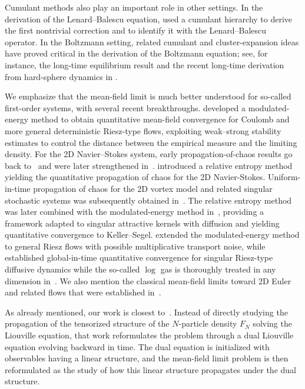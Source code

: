 \documentclass[pdflatex,sn-mathphys-num]{sn-jnl}
\theoremstyle{thmstyleone}%
\theoremstyle{thmstyletwo}%
\theoremstyle{thmstylethree}%
\begin{document}
Cumulant methods also play an important role in other settings. In the derivation of the Lenard--Balescu equation, \cite{duerinckx2021lenard} used a cumulant hierarchy to derive the first nontrivial correction and to identify it with the Lenard--Balescu operator. In the Boltzmann setting, related cumulant and cluster-expansion ideas have proved critical in the derivation of the Boltzmann equation; see, for instance, the long-time equilibrium result \cite{bodineau2024long} and the recent long-time derivation from hard-sphere dynamics in \cite{deng2024long}.

 We emphasize that the mean-field limit is much better understood for so-called first-order systems, with several recent breakthroughs.  \cite{serfaty2020mean} developed a modulated-energy method to obtain quantitative mean-field convergence for Coulomb and more general deterministic Riesz-type flows, exploiting weak--strong stability estimates to control the distance between the empirical measure and the limiting density. For the 2D Navier--Stokes system, early propagation-of-chaos results go back to~\cite{osada1986propagation} and were later strengthened in~\cite{fournier2014propagation}. \cite{jabin2018quantitative} introduced a relative entropy method yielding the quantitative propagation of chaos for the 2D Navier-Stokes. Uniform-in-time propagation of chaos for the 2D vortex model and related singular stochastic systems was subsequently obtained in~\cite{guillin2024uniform}. The relative entropy method was later combined with the modulated-energy method in~\cite{bresch2023mean}, providing a framework adapted to singular attractive kernels with diffusion and yielding quantitative convergence to Keller--Segel. \cite{nguyen2022mean} extended the modulated-energy method to general Riesz flows with possible multiplicative transport noise, while \cite{rosenzweig2023global} established global-in-time quantitative convergence for singular Riesz-type diffusive dynamics while the so-called $\log$ gas is thoroughly treated in any dimension in~\cite{chodron2025attractive}. We also mention the classical mean-field limits toward 2D Euler and related flows that were established in~\cite{goodman1990convergence,goodman1991new,schochet1995weak,schochet1996point}. 

 As already mentioned, our work is closest to~\cite{bresch2024duality}. Instead of directly studying the propagation of the tensorized structure of the $N$-particle density $F_N$ solving the Liouville equation, that work reformulates the problem through a dual Liouville equation evolving backward in time. The dual equation is initialized with observables having a linear structure, and the mean-field limit problem is then reformulated as the study of how this linear structure propagates under the dual structure.
\end{document}
